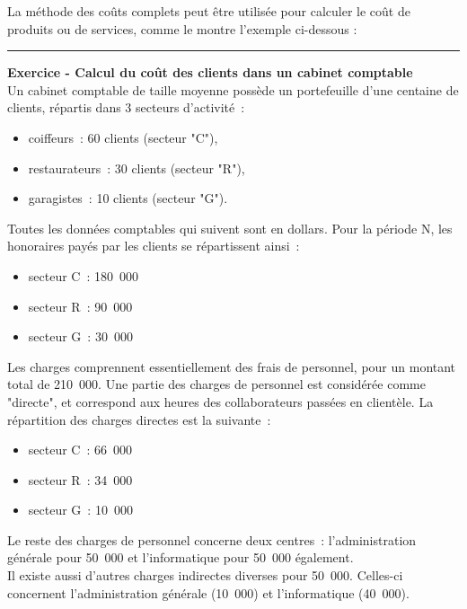 \documentclass{tufte-handout}
\begin{document}
\begin{enumerate}
La méthode des coûts complets peut être utilisée pour calculer le coût de produits ou de services, comme le montre l'exemple ci-dessous :\\

\noindent\rule{\textwidth}{0.5pt}
\textbf{Exercice - Calcul du coût des clients dans un cabinet comptable}\\
Un cabinet comptable de taille moyenne possède un portefeuille d'une centaine de clients, répartis dans 3 secteurs d'activité :\\
\begin{itemize}
\item coiffeurs : 60 clients (secteur "C"),\\
\item restaurateurs : 30 clients (secteur "R"),\\
\item garagistes : 10 clients (secteur "G").\\
\end{itemize}
Toutes les données comptables qui suivent sont en dollars. Pour la période N, les honoraires payés par les clients se répartissent ainsi :\\
\begin{itemize}
\item secteur C : 180 000\\
\item secteur R : 90 000\\
\item secteur G : 30 000\\
\end{itemize}
Les charges comprennent essentiellement des frais de personnel, pour un montant total de 210 000. Une partie des charges de personnel est considérée comme "directe", et correspond aux heures des collaborateurs passées en clientèle. La répartition des charges directes est la suivante :\\
\begin{itemize}
\item secteur C : 66 000\\
\item secteur R : 34 000\\
\item secteur G : 10 000\\
\end{itemize}
Le reste des charges de personnel concerne deux centres : l'administration générale pour 50 000 et l'informatique pour 50 000 également.\\
Il existe aussi d'autres charges indirectes diverses pour 50 000. Celles-ci concernent l'administration générale (10 000) et l'informatique (40 000).\\

\end{enumerate}
\end{document}
